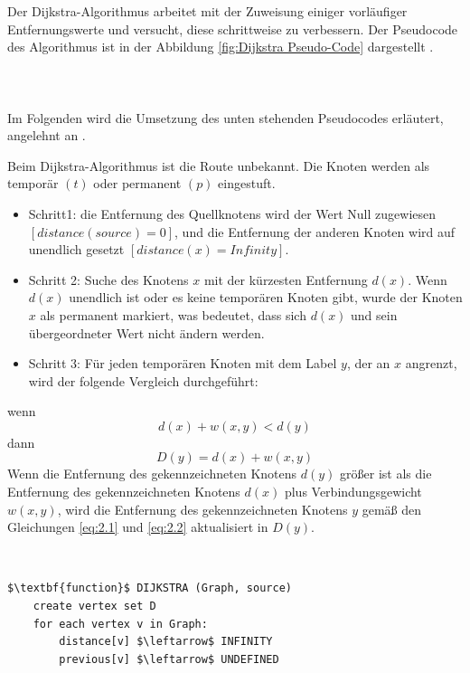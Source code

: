 Der Dijkstra-Algorithmus arbeitet mit der Zuweisung einiger vorläufiger Entfernungswerte und versucht, diese schrittweise zu verbessern.
Der Pseudocode des Algorithmus ist in der Abbildung \ref{fig:Dijkstra Pseudo-Code}  dargestellt \cite{Huang2012}.
\\ \\
\\ \\
Im Folgenden wird die Umsetzung des unten stehenden Pseudocodes erläutert, angelehnt an \cite{Abusalim2020}.

Beim Dijkstra-Algorithmus ist die Route unbekannt. Die Knoten werden als temporär $(t)$ oder permanent $(p)$ eingestuft.
\begin{itemize}
	\item Schritt1: die Entfernung des Quellknotens wird der Wert Null zugewiesen $[distance (source) = 0]$, und die Entfernung der anderen
		Knoten wird auf unendlich gesetzt $[distance(x) = Infinity]$.
	\item Schritt 2: Suche des Knotens $x$ mit der kürzesten Entfernung $d(x)$. Wenn $d(x)$ unendlich ist oder es keine temporären Knoten gibt,
		wurde der Knoten $x$ als permanent markiert, was bedeutet, dass sich $d(x)$ und sein übergeordneter Wert nicht ändern werden.
	\item Schritt 3: Für jeden temporären Knoten mit dem Label $y$, der an $x$ angrenzt, wird der folgende Vergleich durchgeführt:

	
\end{itemize}
wenn
\begin{equation} \label{eq:2.1}
	d(x) + w (x, y) < d(y)	
\end{equation}
dann
\begin{equation} \label{eq:2.2}
	D(y) = d(x) + w (x, y)
\end{equation}
\newline
Wenn die Entfernung des gekennzeichneten Knotens $d(y)$ größer ist als die Entfernung des gekennzeichneten Knotens $d(x)$ plus Verbindungsgewicht $w(x, y)$, 
wird die Entfernung des gekennzeichneten Knotens $y$ gemäß den Gleichungen \ref{eq:2.1} und \ref{eq:2.2} aktualisiert in $D(y)$.

\noindent \\
\begin{minipage}{1.0\textwidth} \small
\begin{lstlisting}
$\textbf{function}$ DIJKSTRA (Graph, source)
	create vertex set D
	for each vertex v in Graph:
		distance[v] $\leftarrow$ INFINITY
		previous[v] $\leftarrow$ UNDEFINED
\end{lstlisting}
\end{minipage}

